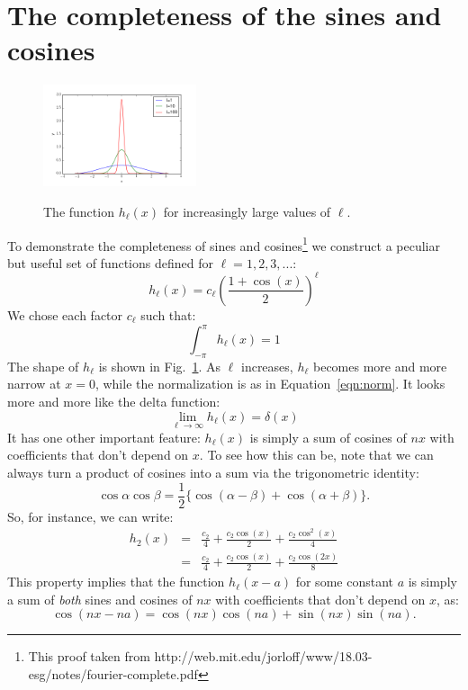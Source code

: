 \documentclass[12pt,oneside]{book}
\begin{document}
\section{The completeness of the sines and cosines}

\begin{figure}[thb]
\begin{center}
{\includegraphics[width=0.40\textwidth]{figs/hk.png}}
\end{center}
\caption{\label{fig:hl} The function $h_\ell(x)$ for increasingly large values of $\ell$.}
\end{figure}

\noindent
To demonstrate the completeness of sines and cosines\footnote{This proof taken from http://web.mit.edu/jorloff/www/18.03-esg/notes/fourier-complete.pdf} we construct a peculiar but useful set of functions defined for $\ell=1,2,3,...$:
\begin{displaymath}
h_\ell(x) = c_\ell \left(\frac{1 + \cos(x)}{2}\right)^\ell
\end{displaymath}
We chose each factor $c_\ell$ such that:
\begin{displaymath}
\int_{-\pi}^{\pi} h_\ell(x) = 1
\end{displaymath}
The shape of $h_\ell$ is shown in Fig.~\ref{fig:hl}.  As $\ell$ increases, $h_\ell$ becomes more and more narrow at $x=0$, while the normalization is as in Equation~\ref{eqn:norm}.  It looks more and more like the delta function:
\begin{displaymath}
\lim_{\ell \to \infty} h_\ell(x) = \delta(x)
\end{displaymath}
It has one other important feature:  $h_\ell(x)$ is simply a sum of cosines of $nx$ with coefficients that don't depend on $x$.  To see how this can be, note that we can always turn a product of cosines into a sum via the trigonometric identity:
\begin{displaymath}
\cos \alpha \cos \beta = \frac{1}{2} \{\cos(\alpha - \beta) + \cos(\alpha + \beta)\}.
\end{displaymath}
So, for instance, we can write:
\begin{eqnarray*}
h_2(x) &=& \frac{c_2}{4} + \frac{c_2\cos(x)}{2}+\frac{c_2\cos^2(x)}{4} \\
           &=& \frac{c_2}{4} + \frac{c_2\cos(x)}{2}+\frac{c_2\cos(2x)}{8}
\end{eqnarray*}
This property implies that the function $h_\ell(x-a)$ for some constant $a$ is simply a sum of {\em both} sines and cosines of $nx$ with coefficients that don't depend on $x$, as:
\begin{displaymath}
\cos(nx-na) = \cos(nx)\cos(na) + \sin(nx)\sin(na).
\end{displaymath}
\end{document}
